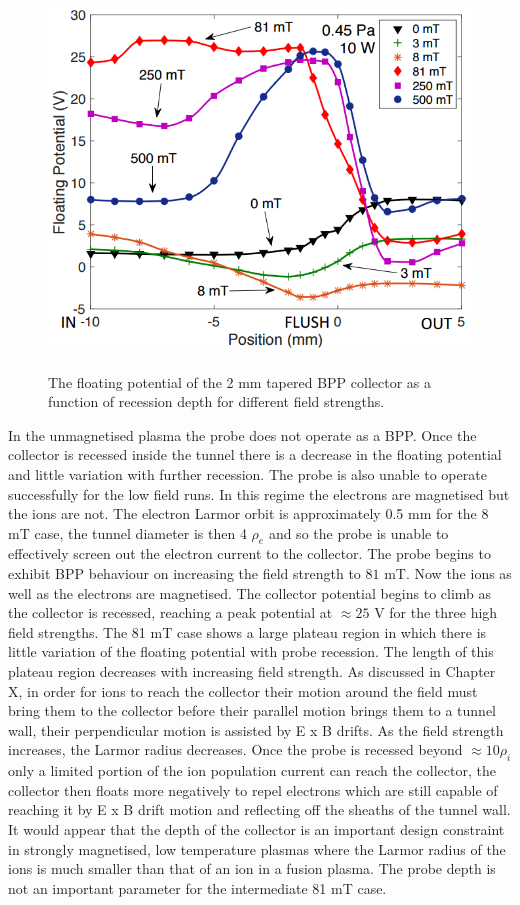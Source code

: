 \begin{figure}[H]
\centering
\includegraphics[width=1.0\textwidth, height = 10cm]{field_investigation.png}
\caption{The floating potential of the 2 mm tapered BPP collector as a function of recession depth for different field strengths. }
\label{fig:fieldInvest}
\end{figure}

In the unmagnetised plasma the probe does not operate as a BPP. Once the collector is recessed inside the tunnel there is a decrease in the floating potential and little variation with further recession. The probe is also unable to operate successfully for the low field runs. In this regime the electrons are magnetised but the ions are not. The electron Larmor orbit is approximately 0.5 mm for the 8 mT case, the tunnel diameter is then 4 $\rho_e$ and so the probe is unable to effectively screen out the electron current to the collector. The probe begins to exhibit BPP behaviour on increasing the field strength to $81$ mT. Now the ions as well as the electrons are magnetised. The collector potential begins to climb as the collector is recessed, reaching a peak potential at $\approx 25$ V for the three high field strengths. The 81 mT case shows a large plateau region in which there is little variation of the floating potential with probe recession. The length of this plateau region decreases with increasing field strength. As discussed in Chapter X, in order for ions to reach the collector their motion around the field must bring them to the collector before their parallel motion brings them to a tunnel wall, their perpendicular motion is assisted by E x B drifts. As the field strength increases, the Larmor radius decreases. Once the probe is recessed beyond $\approx 10\rho_i$ only a limited portion of the ion population current can reach the collector, the collector then floats more negatively to repel electrons which are still capable of reaching it by E x B drift motion and reflecting off the sheaths of the tunnel wall. It would appear that the depth of the collector is an important design constraint in strongly magnetised, low temperature plasmas where the Larmor radius of the ions is much smaller than that of an ion in a fusion plasma. The probe depth is not an important parameter for the intermediate 81 mT case. 

